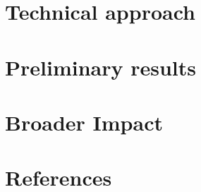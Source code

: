 \documentclass{article}
\begin{document}
\section{Technical approach}


\section{Preliminary results}



\section*{Broader Impact}



\section*{References}

{\small


}
\end{document}
